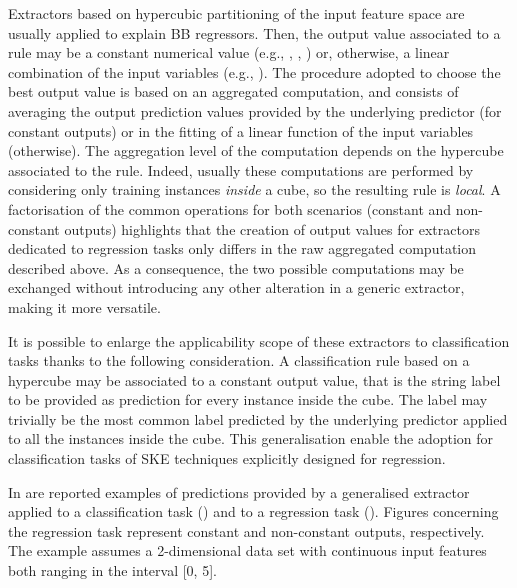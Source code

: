 \documentclass[
]{ceurart}
\begin{document}
Extractors based on hypercubic partitioning of the input feature space are usually applied to explain BB regressors.
%
Then, the output value associated to a rule may be a constant numerical value (e.g., \iter{}, \gridex{}, \cart{}) or, otherwise, a linear combination of the input variables (e.g., \cart{}).
%
The procedure adopted to choose the best output value is based on an aggregated computation, and consists of averaging the output prediction values provided by the underlying predictor (for constant outputs) or in the fitting of a linear function of the input variables (otherwise).
%
The aggregation level of the computation depends on the hypercube associated to the rule.
%
Indeed, usually these computations are performed by considering only training instances \emph{inside} a cube, so the resulting rule is \emph{local}.
%
A factorisation of the common operations for both scenarios (constant and non-constant outputs) highlights that the creation of output values for extractors dedicated to regression tasks only differs in the raw aggregated computation described above.
%
As a consequence, the two possible computations may be exchanged without introducing any other alteration in a generic extractor, making it more versatile.

It is possible to enlarge the applicability scope of these extractors to classification tasks thanks to the following consideration.
%
A classification rule based on a hypercube may be associated to a constant output value, that is the string label to be provided as prediction for every instance inside the cube.
%
The label may trivially be the most common label predicted by the underlying predictor applied to all the instances inside the cube.
%
This generalisation enable the adoption for classification tasks of SKE techniques explicitly designed for regression.



In  are reported examples of predictions provided by a generalised extractor applied to a classification task () and to a regression task ().
%
Figures concerning the regression task represent constant and non-constant outputs, respectively.
%
The example assumes a 2-dimensional data set with continuous input features both ranging in the interval [0, 5].

%
%
%
%
%
%
\end{document}
